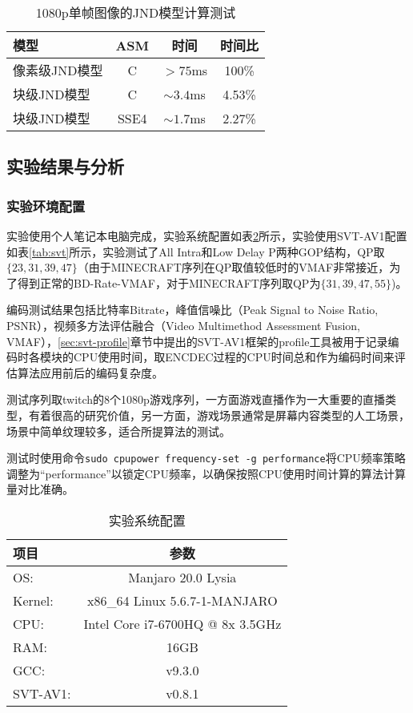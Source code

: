   \begin{table}[!hpt]
    \renewcommand{\arraystretch}{0.9}
    \caption{1080p单帧图像的JND模型计算测试}
    \label{tab:jnd-compute}
    \centering
    \begin{tabular}{lccc} \toprule
      模型 & ASM & 时间 &时间比  \\ \midrule
      像素级JND模型 & C   & $>75$ms & 100\% \\
      块级JND模型   & C & $\sim 3.4$ms & 4.53\% \\
      块级JND模型   & SSE4 & $\sim 1.7$ms & 2.27\%\\ \bottomrule
    \end{tabular}
  \end{table}

  

  \subsection{实验结果与分析}

  \subsubsection{实验环境配置}
  实验使用个人笔记本电脑完成，实验系统配置如表\ref{tab:os}所示，实验使用SVT-AV1配置如表\ref{tab:svt}所示，实验测试了All Intra和Low Delay P两种GOP结构，QP取$\{23, 31, 39, 47\}$（由于MINECRAFT序列在QP取值较低时的VMAF非常接近，为了得到正常的BD-Rate-VMAF，对于MINECRAFT序列取QP为$\{31, 39, 47, 55\}$)。
  
  编码测试结果包括比特率Bitrate，峰值信噪比（Peak Signal to Noise Ratio, PSNR），视频多方法评估融合（Video Multimethod Assessment Fusion, VMAF\cite{liPracticalPerceptualVideo}），\ref{sec:svt-profile}章节中提出的SVT-AV1框架的profile工具被用于记录编码时各模块的CPU使用时间，取ENCDEC过程的CPU时间总和作为编码时间来评估算法应用前后的编码复杂度。

  测试序列取twitch的8个1080p游戏序列，一方面游戏直播作为一大重要的直播类型，有着很高的研究价值，另一方面，游戏场景通常是屏幕内容类型的人工场景，场景中简单纹理较多，适合所提算法的测试。

  测试时使用命令\texttt{sudo cpupower frequency-set -g performance}将CPU频率策略调整为“performance”以锁定CPU频率，以确保按照CPU使用时间计算的算法计算量对比准确。

  \begin{table}[!hpt]
    \renewcommand{\arraystretch}{0.9}
    \caption{实验系统配置}
    \label{tab:os}
    \centering
    \begin{tabular}{lc} \toprule
      项目& 参数  \\ \midrule
      OS:     &Manjaro 20.0 Lysia\\
      Kernel: & x86\_64 Linux 5.6.7-1-MANJARO\\
      CPU:    &Intel Core i7-6700HQ @ 8x 3.5GHz\\
      RAM:    &16GB\\
      GCC:    &v9.3.0\\
      SVT-AV1: & v0.8.1\\ \bottomrule
    \end{tabular}
  \end{table}

